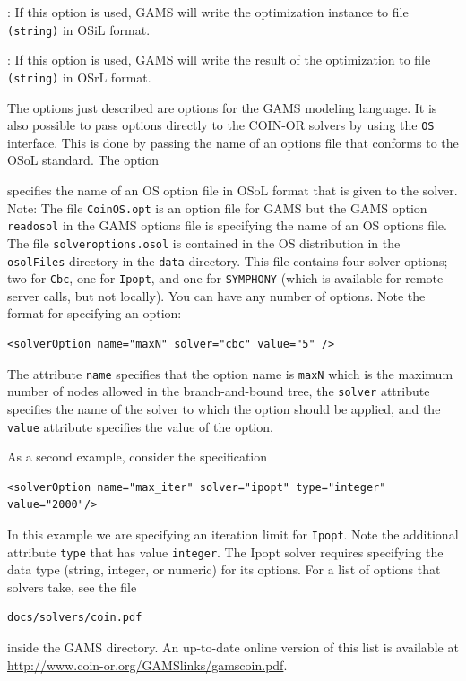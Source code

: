 \documentclass[11pt]{article}
\renewcommand{\_}{{\char"5F}}
\renewcommand{\{}{{\char"7B}}
\renewcommand{\}}{{\char"7D}}
\renewcommand{\^}{{\char"0D}}
\renewcommand{\'}{{\char"0D}}
\begin{document}
\begin{enumerate}[Step 1:]
\vskip 8pt
:  If this option is used, GAMS will write the optimization instance 
to file {\tt (string)} in    OSiL   format.
\vskip 8pt

\vskip 8pt
:  If this option is used, GAMS will write the result of the optimization 
to file {\tt (string)} in OSrL  format.
\vskip 8pt

The options just described are options for the GAMS modeling language.  
It is also possible to pass options directly to the COIN-OR solvers by using the {\tt OS} interface.
This is done by passing the name of an options file that conforms to the  OSoL  standard.  
The option

\vskip 8pt
  specifies the name of an OS option  file in OSoL format that is 
given to the solver.  Note: The file  {\tt CoinOS.opt} is an option  file for GAMS but the GAMS option 
{\tt readosol} in the GAMS options file  is specifying the name of an OS options file. 
\vskip 8pt
The file {\tt solveroptions.osol} is contained in the OS distribution in the {\tt osolFiles} directory   
in the {\tt data} directory. This file contains four solver options; two for {\tt Cbc}, one for {\tt Ipopt},
and one for {\tt SYMPHONY} (which is available for remote server calls, but not locally).  
You can have any number of options. Note the format for specifying an option:
\begin{verbatim}
<solverOption name="maxN" solver="cbc" value="5" />
\end{verbatim}
The attribute {\tt name} specifies that the option name is {\tt maxN} which is the maximum number of nodes 
allowed in the branch-and-bound tree, the {\tt solver} attribute specifies the name of the solver to which
the option should be applied, and the {\tt value} attribute specifies the value of the option. 

As a second example, consider the specification
\begin{verbatim}
<solverOption name="max_iter" solver="ipopt" type="integer" value="2000"/> 
\end{verbatim}
In this example we are specifying an iteration limit for {\tt Ipopt}.  Note the additional attribute 
{\tt type} that has value  {\tt integer}. The Ipopt solver requires specifying the data type 
(string, integer, or numeric) for its options.   For a list of options that solvers take, 
see the file
\begin{verbatim}
docs/solvers/coin.pdf
\end{verbatim}
inside the GAMS directory. 
An up-to-date online version of this list is available at \url{http://www.coin-or.org/GAMSlinks/gamscoin.pdf}.




\end{enumerate}
\end{document}
